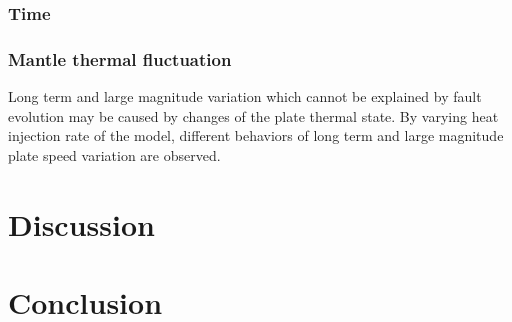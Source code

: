 \documentclass[letterpaper,12pt,notitle]{memphisthesis}                     %
\begin{document}
\subsection{Time }

\subsection{Mantle thermal fluctuation}

Long term and large magnitude variation which cannot be explained by fault evolution may be caused by changes of the plate thermal state. By varying heat injection rate of the model, different behaviors of long term and large magnitude plate speed variation are observed. 


\chapter{Discussion}

\chapter{Conclusion}

\end{document}
